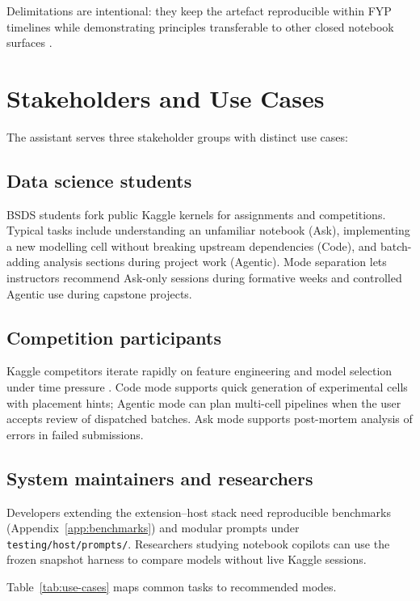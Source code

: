 Delimitations are intentional: they keep the artefact reproducible within FYP timelines while demonstrating principles transferable to other closed notebook surfaces \parencite{mcnutt2023notebookassistants}.

\section{Stakeholders and Use Cases}
\label{sec:stakeholders}

The assistant serves three stakeholder groups with distinct use cases:

\subsection{Data science students}

\acf{BSDS} students fork public Kaggle kernels for assignments and competitions. Typical tasks include understanding an unfamiliar notebook (Ask), implementing a new modelling cell without breaking upstream dependencies (Code), and batch-adding analysis sections during project work (Agentic). Mode separation lets instructors recommend Ask-only sessions during formative weeks and controlled Agentic use during capstone projects.

\subsection{Competition participants}

Kaggle competitors iterate rapidly on feature engineering and model selection under time pressure \parencite{quaranta2022bestpractices}. Code mode supports quick generation of experimental cells with placement hints; Agentic mode can plan multi-cell pipelines when the user accepts review of dispatched batches. Ask mode supports post-mortem analysis of errors in failed submissions.

\subsection{System maintainers and researchers}

Developers extending the extension--host stack need reproducible benchmarks (Appendix~\ref{app:benchmarks}) and modular prompts under \texttt{testing/host/prompts/}. Researchers studying notebook copilots can use the frozen snapshot harness to compare models without live Kaggle sessions.

Table~\ref{tab:use-cases} maps common tasks to recommended modes.

